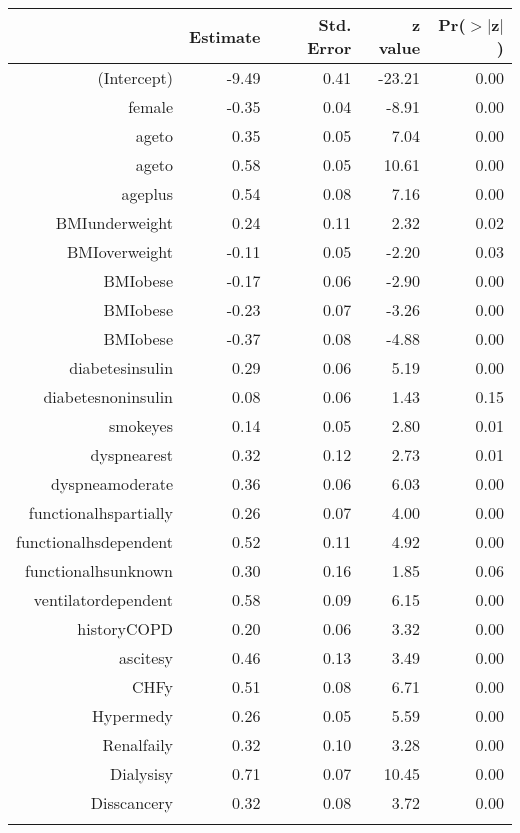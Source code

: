 \bigskip\bigskip
\centering
\begin{tabular}{rrrrr}
  \hline
 & Estimate & Std. Error & z value & Pr($>$$|$z$|$) \\ 
  \hline
(Intercept) & -9.49 & 0.41 & -23.21 & 0.00 \\ 
  female & -0.35 & 0.04 & -8.91 & 0.00 \\ 
  age\-65\-to\-74 & 0.35 & 0.05 & 7.04 & 0.00 \\ 
  age\-75\-to\-84 & 0.58 & 0.05 & 10.61 & 0.00 \\ 
  age\-85\-plus & 0.54 & 0.08 & 7.16 & 0.00 \\ 
  BMI\-underweight & 0.24 & 0.11 & 2.32 & 0.02 \\ 
  BMI\-overweight & -0.11 & 0.05 & -2.20 & 0.03 \\ 
  BMI\-obese\-1 & -0.17 & 0.06 & -2.90 & 0.00 \\ 
  BMI\-obese\-2 & -0.23 & 0.07 & -3.26 & 0.00 \\ 
  BMI\-obese\-3 & -0.37 & 0.08 & -4.88 & 0.00 \\ 
  diabetes\-insulin & 0.29 & 0.06 & 5.19 & 0.00 \\ 
  diabetes\-noninsulin & 0.08 & 0.06 & 1.43 & 0.15 \\ 
  smoke\-yes & 0.14 & 0.05 & 2.80 & 0.01 \\ 
  dyspnea\-rest & 0.32 & 0.12 & 2.73 & 0.01 \\ 
  dyspnea\-moderate & 0.36 & 0.06 & 6.03 & 0.00 \\ 
  functional\-hs\-partially & 0.26 & 0.07 & 4.00 & 0.00 \\ 
  functional\-hs\-dependent & 0.52 & 0.11 & 4.92 & 0.00 \\ 
  functional\-hs\-unknown & 0.30 & 0.16 & 1.85 & 0.06 \\ 
  ventilator\-dependent & 0.58 & 0.09 & 6.15 & 0.00 \\ 
  history\-COPD & 0.20 & 0.06 & 3.32 & 0.00 \\ 
  ascites\-y & 0.46 & 0.13 & 3.49 & 0.00 \\ 
  CHF\-y & 0.51 & 0.08 & 6.71 & 0.00 \\ 
  Hyper\-med\-y & 0.26 & 0.05 & 5.59 & 0.00 \\ 
  Renal\-fail\-y & 0.32 & 0.10 & 3.28 & 0.00 \\ 
  Dialysis\-y & 0.71 & 0.07 & 10.45 & 0.00 \\ 
  Diss\-cancer\-y & 0.32 & 0.08 & 3.72 & 0.00 \\ 
$$
\end{tabular}
